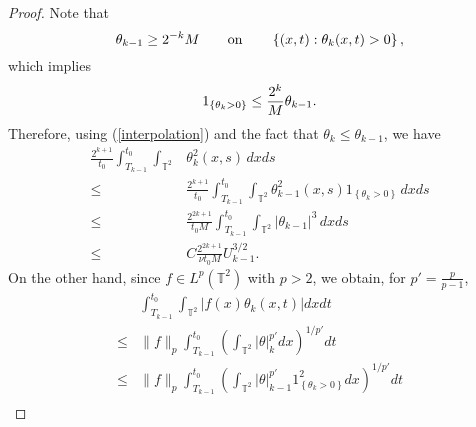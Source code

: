 \documentclass{amsart}
\numberwithin{Theorem}{section}
\theoremstyle{definition}
\theoremstyle{remark}
\begin{document}
\begin{proof}
Note that
\begin{equation}\notag
\theta_{k-1}\geq 2^{-k}M \qquad \mbox {on} \qquad  \left\{(x,t):\theta_k(x,t)>0\right\},
\end{equation}
which implies
\begin{equation}\notag
1_{\left\{\theta_k>0\right\}}\leq \frac{2^k}{M}\theta_{k-1}.
\end{equation}
Therefore, using (\ref{interpolation}) and the fact that $\theta_k\leq\theta_{k-1}$, we have
\begin{equation}\label{truncated2}
\begin{split}
\frac{2^{k+1}}{t_0}\int_{T_{k-1}}^{t_0}\int_{\mathbb T^2}& \theta_k^2(x,s)\,dxds\\
\leq &\frac{2^{k+1}}{t_0}\int_{T_{k-1}}^{t_0}\int_{\mathbb T^2} \theta_{k-1}^2(x,s)1_{\left\{\theta_k>0\right\}}\,dxds\\
\leq &\frac{2^{2k+1}}{t_0M}\int_{T_{k-1}}^{t_0}\int_{\mathbb T^2} |\theta_{k-1}|^3\,dxds\\
\leq &C\frac{2^{2k+1}}{\nu t_0M}U_{k-1}^{3/2}.
\end{split}
\end{equation}
On the other hand, since $f\in L^p(\mathbb T^2)$ with $p>2$, we obtain, for $p'=\frac{p}{p-1}$,
\begin{equation}\label{truncated3}
\begin{split}
&\int_{T_{k-1}}^{t_0} \int_{\mathbb T^2}\left|f(x) \theta_k(x,t)\right|dxdt\\
\leq &\|f\|_p\int_{T_{k-1}}^{t_0} \left(\int_{\mathbb T^2}|\theta|^{p'}_kdx\right)^{1/{p'}}dt\\
\leq &\|f\|_p\int_{T_{k-1}}^{t_0} \left(\int_{\mathbb T^2}|\theta|^{p'}_{k-1}1^2_{\left\{\theta_k>0\right\}}dx\right)^{1/{p'}}dt\\

\end{split}
\end{equation}
\end{proof}
\end{document}
